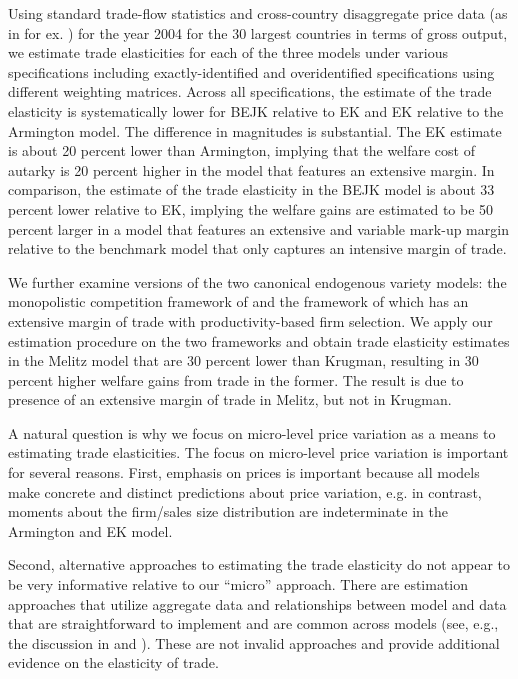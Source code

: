 \documentclass[12pt,dvips, ps2pdf]{article}
\begin{document}
Using standard trade-flow statistics and cross-country disaggregate price data (as in for ex. \citet{hk04}) for the year 2004 for the 30 largest countries in terms of gross output, we estimate trade elasticities for each of the three models under various specifications including exactly-identified and overidentified specifications using different weighting matrices. Across all specifications, the estimate of the trade elasticity is systematically lower for BEJK relative to EK and EK relative to the Armington model. The difference in magnitudes is substantial. The EK estimate is about 20 percent lower than Armington, implying that the welfare cost of autarky is 20 percent higher in the model that features an extensive margin. In comparison, the estimate of the trade elasticity in the BEJK model is about 33 percent lower relative to EK, implying the welfare gains are estimated to be 50 percent larger in a model that features an extensive and variable mark-up margin relative to the benchmark model that only captures an intensive margin of trade.

We further examine versions of the two canonical endogenous variety models: the monopolistic competition framework of \citet{krug80} and the framework of \citet{mel03} which has an extensive margin of trade with productivity-based firm selection. We apply our estimation procedure on the two frameworks and obtain trade elasticity estimates in the Melitz model that are 30 percent lower than Krugman, resulting in 30 percent higher welfare gains from trade in the former. The result is due to presence of an extensive margin of trade in Melitz, but not in Krugman.

A natural question is why we focus on micro-level price variation as a means to estimating trade elasticities. The focus on micro-level price variation is important for several reasons. First, emphasis on prices is important because all models make concrete and distinct predictions about price variation, e.g. in contrast, moments about the firm/sales size distribution are indeterminate in the Armington and EK model.

Second, alternative approaches to estimating the trade elasticity do not appear to be very informative relative to our ``micro'' approach. There are estimation approaches that utilize aggregate data and relationships between model and data that are straightforward to implement and are common across models (see, e.g., the discussion in \citet{acr09} and \citet{caliendo2010}). These are not invalid approaches and provide additional evidence on the elasticity of trade.
\end{document}
